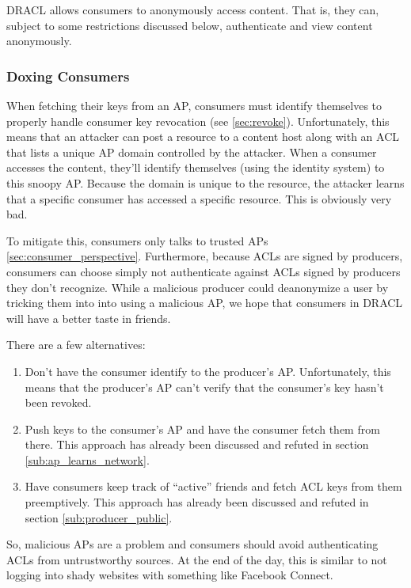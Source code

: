 \documentclass[pdftex,12pt,a4papaer,twoside,notitlepage]{report}
\begin{document}
DRACL allows consumers to anonymously access content. That is, they can, subject
to some restrictions discussed below, authenticate and view content anonymously.

\subsubsection{Doxing Consumers}
\label{sub:doxing_consumers}

When fetching their keys from an AP, consumers must identify themselves to
properly handle consumer key revocation (see \cref{sec:revoke}). Unfortunately,
this means that an attacker can post a resource to a content host along with an
ACL that lists a unique AP domain controlled by the attacker. When a consumer
accesses the content, they'll identify themselves (using the identity system) to
this snoopy AP. Because the domain is unique to the resource, the attacker
learns that a specific consumer has accessed a specific resource. This is
obviously very bad.

To mitigate this, consumers only talks to trusted APs
\cref{sec:consumer_perspective}. Furthermore, because ACLs are signed by
producers, consumers can choose simply not authenticate against ACLs signed by
producers they don't recognize. While a malicious producer could deanonymize a
user by tricking them into into using a malicious AP, we hope that consumers in
DRACL will have a better taste in friends.

There are a few alternatives:

\begin{enumerate}
\item Don't have the consumer identify to the producer's AP. Unfortunately, this
  means that the producer's AP can't verify that the consumer's key hasn't been
  revoked.
\item Push keys to the consumer's AP and have the consumer fetch them from
  there. This approach has already been discussed and refuted in section
  \cref{sub:ap_learns_network}.
\item Have consumers keep track of ``active'' friends and fetch ACL keys from
  them preemptively. This approach has already been discussed and refuted in
  section \cref{sub:producer_public}.
\end{enumerate}

So, malicious APs are a problem and consumers should avoid authenticating ACLs
from untrustworthy sources. At the end of the day, this is similar to not
logging into shady websites with something like Facebook Connect.
\end{document}
